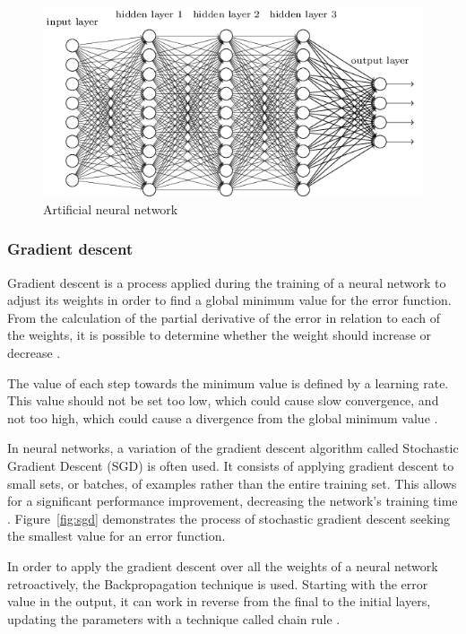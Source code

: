 \documentclass[a4paper,fleqn]{cas-sc}
\begin{document}
\begin{figure}[h!]
	\caption{Artificial neural network}
	\label{fig:ann}
	\centering%
	\begin{minipage}{.8\textwidth}
		\includegraphics[width=\textwidth]{images/ann_nielsen.png}
	\end{minipage}
\end{figure}

\subsubsection{Gradient descent}
Gradient descent is a process applied during the training of a neural network to adjust its weights in order to find a global minimum value for the error function. From the calculation of the partial derivative of the error in relation to each of the weights, it is possible to determine whether the weight should increase or decrease \cite{heaton2015}.

The value of each step towards the minimum value is defined by a learning rate. This value should not be set too low, which could cause slow convergence, and not too high, which could cause a divergence from the global minimum value \cite{geron2019hands}.

In neural networks, a variation of the gradient descent algorithm called Stochastic Gradient Descent (SGD) is often used. It consists of applying gradient descent to small sets, or batches, of examples rather than the entire training set. This allows for a significant performance improvement, decreasing the network's training time \cite{LeCun2015deep}. Figure~\ref{fig:sgd} demonstrates the process of stochastic gradient descent seeking the smallest value for an error function.

In order to apply the gradient descent over all the weights of a neural network retroactively, the Backpropagation \cite{rumelhart1986learning} technique is used. Starting with the error value in the output, it can work in reverse from the final to the initial layers, updating the parameters with a technique called chain rule \cite{chollet2017deep}.
\end{document}
